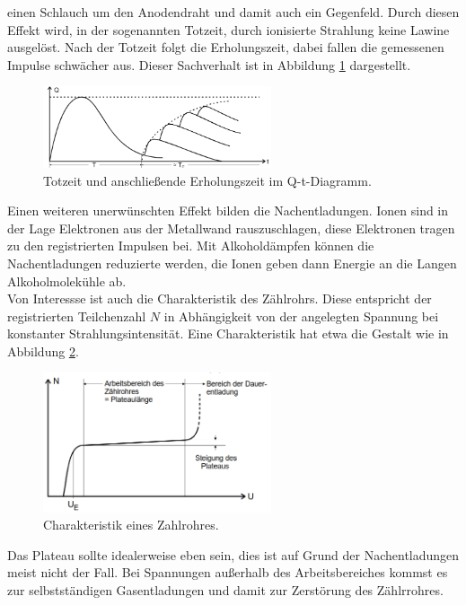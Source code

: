 einen Schlauch um den Anodendraht und damit auch ein Gegenfeld.
Durch diesen Effekt wird, in der sogenannten Totzeit, durch ionisierte Strahlung
keine Lawine ausgelöst. Nach der Totzeit folgt die Erholungszeit, dabei fallen die gemessenen Impulse schwächer aus. Dieser Sachverhalt ist in Abbildung
\ref{fig:totzeit} dargestellt.
\begin{figure}
  \centering
  \includegraphics[width=0.6\textwidth]{tz.PNG}
  \caption{Totzeit und anschließende Erholungszeit im Q-t-Diagramm.}
  \label{fig:totzeit}
\end{figure}
Einen weiteren unerwünschten Effekt bilden die Nachentladungen. Ionen sind in der Lage Elektronen aus der Metallwand rauszuschlagen,
diese Elektronen tragen zu den registrierten Impulsen bei. Mit Alkoholdämpfen können die Nachentladungen reduzierte werden, die
Ionen geben dann Energie an die Langen Alkoholmolekühle ab.\\
Von Interessse ist auch die Charakteristik des Zählrohrs. Diese entspricht der registrierten Teilchenzahl $N$ in Abhängigkeit von der
angelegten Spannung bei konstanter Strahlungsintensität. Eine Charakteristik hat etwa die Gestalt wie in Abbildung \ref{fig:char}.
\begin{figure}
  \centering
  \includegraphics[width=0.6\textwidth]{char.PNG}
  \caption{Charakteristik eines Zahlrohres.}
  \label{fig:char}
\end{figure}
Das Plateau sollte idealerweise eben sein, dies ist auf Grund der Nachentladungen meist nicht der Fall.
Bei Spannungen außerhalb des Arbeitsbereiches kommst es zur selbstständigen Gasentladungen und damit zur Zerstörung des Zählrrohres.
